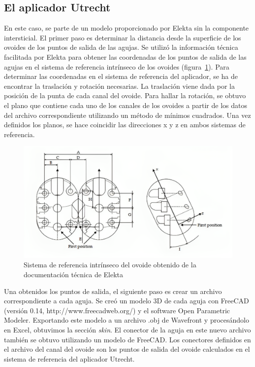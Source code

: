 \documentclass[
  a4paper,
]{scrreprt}
\begin{document}
\hypertarget{sec-apputrecht}{%
\subsection{El aplicador Utrecht}\label{sec-apputrecht}}

En este caso, se parte de un modelo proporcionado por Elekta sin la
componente intersticial. El primer paso es determinar la distancia desde
la superficie de los ovoides de los puntos de salida de las agujas. Se
utilizó la información técnica facilitada por Elekta para obtener las
coordenadas de los puntos de salida de las agujas en el sistema de
referencia intrínseco de los ovoides (figura~\ref{fig-esquemautrecht}).
Para determinar las coordenadas en el sistema de referencia del
aplicador, se ha de encontrar la traslación y rotación necesarias. La
traslación viene dada por la posición de la punta de cada canal del
ovoide. Para hallar la rotación, se obtuvo el plano que contiene cada
uno de los canales de los ovoides a partir de los datos del archivo
correspondiente utilizando un método de mínimos cuadrados. Una vez
definidos los planos, se hace coincidir las direcciones x y z en ambos
sistemas de referencia.

\begin{figure}

{\centering \includegraphics{img/Esquema_utrecht.PNG}

}

\caption{\label{fig-esquemautrecht}Sistema de referencia intrínseco del
ovoide obtenido de la documentación técnica de Elekta}

\end{figure}

Una obtenidos los puntos de salida, el siguiente paso es crear un
archivo correspondiente a cada aguja. Se creó un modelo 3D de cada aguja
con FreeCAD (versión 0.14, http://www.freecadweb.org/) y el software
Open Parametric Modeler. Exportando este modelo a un archivo .obj de
Wavefront y procesándolo en Excel, obtuvimos la sección \emph{skin}. El
conector de la aguja en este nuevo archivo también se obtuvo utilizando
un modelo de FreeCAD. Los conectores definidos en el archivo del canal
del ovoide son los puntos de salida del ovoide calculados en el sistema
de referencia del aplicador Utrecht.
\end{document}
